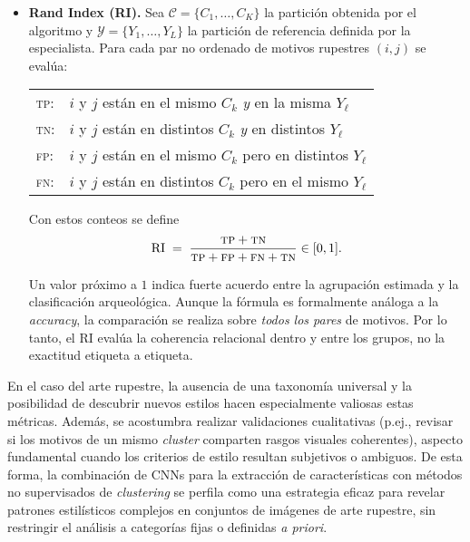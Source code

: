 \begin{itemize}
    \item \textbf{Rand Index (RI).}
    Sea \(\mathcal{C}=\{C_1,\dots,C_K\}\) la partición obtenida por el algoritmo
    y \(\mathcal{Y}=\{Y_1,\dots,Y_L\}\) la partición de referencia definida por la especialista.
    Para cada par no ordenado de motivos rupestres \((i,j)\) se evalúa:

    \begin{center}
    \begin{tabular}{@{}ll@{}}
    \textsc{tp}: & \(i\) y \(j\) están en el mismo \(C_k\) \emph{y} en la misma \(Y_\ell\) \\[2pt]
    \textsc{tn}: & \(i\) y \(j\) están en distintos \(C_k\) \emph{y} en distintos \(Y_\ell\) \\[2pt]
    \textsc{fp}: & \(i\) y \(j\) están en el mismo \(C_k\) pero en distintos \(Y_\ell\) \\[2pt]
    \textsc{fn}: & \(i\) y \(j\) están en distintos \(C_k\) pero en el mismo \(Y_\ell\)
    \end{tabular}
    \end{center}
    
    Con estos conteos se define
    \[
      \operatorname{RI} \;=\;
      \frac{\textsc{tp} + \textsc{tn}}
           {\textsc{tp} + \textsc{fp} + \textsc{fn} + \textsc{tn}}
      \in [0,1].
    \]

    Un valor próximo a \(1\) indica fuerte acuerdo entre la agrupación estimada y la clasificación arqueológica.
    Aunque la fórmula es formalmente análoga a la \emph{accuracy}, la comparación se realiza sobre \emph{todos los pares} de motivos.
    Por lo tanto, el RI evalúa la coherencia relacional dentro y entre los grupos, no la exactitud etiqueta a etiqueta.
\end{itemize}

En el caso del arte rupestre, la ausencia de una taxonomía universal y la posibilidad de descubrir nuevos estilos hacen especialmente valiosas estas métricas.
Además, se acostumbra realizar validaciones cualitativas (p.ej., revisar si los motivos de un mismo \textit{cluster} comparten rasgos visuales coherentes), aspecto fundamental cuando los criterios de estilo resultan subjetivos o ambiguos.
De esta forma, la combinación de CNNs para la extracción de características con métodos no supervisados de \textit{clustering} se perfila como una estrategia eficaz para revelar patrones estilísticos complejos en conjuntos de imágenes de arte rupestre, sin restringir el análisis a categorías fijas o definidas \textit{a priori}.


